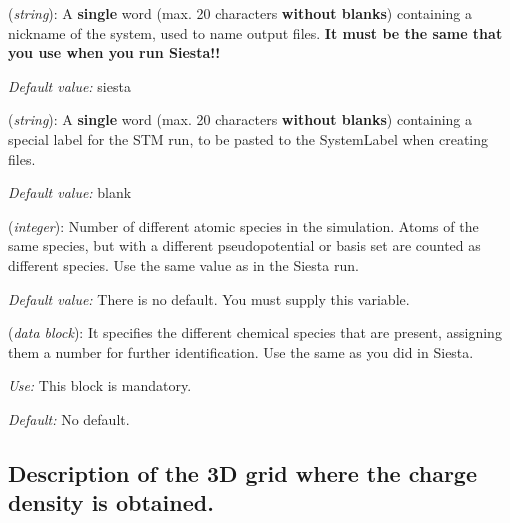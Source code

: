 \begin{description}
\itemsep 10pt
\parsep 0pt

\item[{\bf SystemLabel}] ({\it string}): 
A {\bf single} word (max. 20 characters {\bf without blanks})
containing a nickname of the system, used to name output files. 
{\bf It must be the same that you use when you run {\sc Siesta}!!}

{\it Default value:} siesta

\item[{\bf STM.label}] ({\it string}): 
A {\bf single} word (max. 20 characters {\bf without blanks})
containing a special label for the STM run, to be pasted to the
SystemLabel when creating files.

{\it Default value:} blank

\item[{\bf NumberOfSpecies}] ({\it integer}):
Number of different atomic species in the simulation.
Atoms of the same species, but with a different
pseudopotential or basis set are counted as different species.
Use the same value as in the {\sc Siesta} run.

{\it Default value:} There is no default. You must supply this variable.


\item[{\bf ChemicalSpeciesLabel}] ({\it data block}):
It specifies the different chemical species that are present,
assigning them a number for further identification.
Use the same as you did in {\sc Siesta}.

{\it Use:} This block is mandatory.

{\it Default:} No default.
\end{description}


\vspace{5pt}
\subsection{Description of the 3D grid where the charge density is obtained.}

